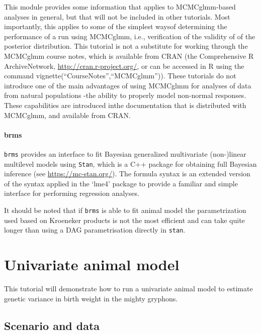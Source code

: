 \documentclass[
  12pt,
]{book}
\begin{document}
This module provides some information that applies to MCMCglmm-based analyses in general, but that will not be included in other tutorials.
Most importantly, this applies to some of the simplest waysof determining the performance of a run using MCMCglmm, i.e., verification of the validity of of the posterior distribution.
This tutorial is not a substitute for working through the MCMCglmm course notes, which is available from CRAN (the Comprehensive R ArchiveNetwork, \url{http://cran.r-project.org/}, or can be accessed in R using the command vignette(``CourseNotes'',``MCMCglmm'')).
These tutorials do not introduce one of the main advantages of using MCMCglmm for analyses of data from natural populations -the ability to properly model non-normal responses.
These capabilities are introduced inthe documentation that is distributed with MCMCglmm, and available from CRAN.

\hypertarget{brms}{%
\subsubsection{brms}\label{brms}}

\texttt{brms} provides an interface to fit Bayesian generalized multivariate (non-)linear multilevel models using \texttt{Stan}, which is a C++ package for obtaining full Bayesian inference (see \url{https://mc-stan.org/}).
The formula syntax is an extended version of the syntax applied in the `lme4' package to provide a familiar and simple interface for performing regression analyses.

It should be noted that if \texttt{brms} is able to fit animal model the parametrization used based on Kroeneker products is not the most efficient and can take quite longer than using a DAG parametrisation directly in \texttt{stan}.

\hypertarget{univariate-animal-model}{%
\chapter{Univariate animal model}\label{univariate-animal-model}}

This tutorial will demonstrate how to run a univariate animal model to estimate genetic variance in birth weight in the mighty gryphons.

\hypertarget{scenario-and-data}{%
\section{Scenario and data}\label{scenario-and-data}}
\end{document}
